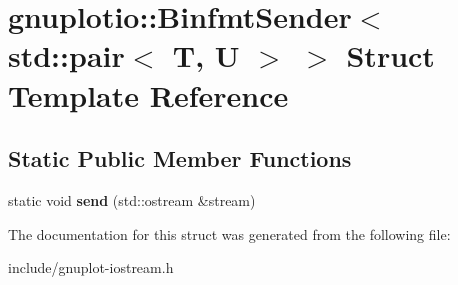 \hypertarget{structgnuplotio_1_1BinfmtSender_3_01std_1_1pair_3_01T_00_01U_01_4_01_4}{}\section{gnuplotio\+:\+:Binfmt\+Sender$<$ std\+:\+:pair$<$ T, U $>$ $>$ Struct Template Reference}
\label{structgnuplotio_1_1BinfmtSender_3_01std_1_1pair_3_01T_00_01U_01_4_01_4}
\subsection*{Static Public Member Functions}
\begin{DoxyCompactItemize}
\item 
\mbox{\label{structgnuplotio_1_1BinfmtSender_3_01std_1_1pair_3_01T_00_01U_01_4_01_4_a08b2bedbc54824cd202c664116e37243}} 
static void {\bfseries send} (std\+::ostream \&stream)
\end{DoxyCompactItemize}


The documentation for this struct was generated from the following file\+:\begin{DoxyCompactItemize}
\item 
include/gnuplot-\/iostream.\+h\end{DoxyCompactItemize}
